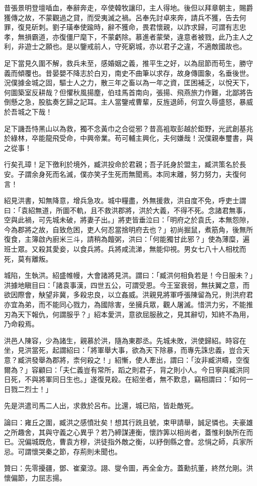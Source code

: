 \begin{pinyinscope}
昔張景明登壇喢血，奉辭奔走，卒使韓牧讓印，主人得地。後但以拜章朝主，賜爵獲傳之故，不蒙觀過之貸，而受夷滅之禍。呂奉先討卓來奔，請兵不獲，告去何罪，復見斫刺。劉子璜奉使踰時，辭不獲命，畏君懷親，以詐求歸，可謂有志忠孝，無損霸道，亦復僵尸麾下，不蒙虧除。慕進者蒙榮，違意者被戮，此乃主人之利，非遊士之願也。是以鑒戒前人，守死窮城，亦以君子之違，不適敵國故也。

足下當見久圍不解，救兵未至，感婚姻之義，推平生之好，以為屈節而苟生，勝守義而傾覆也。昔晏嬰不降志於白刃，南史不曲筆以求存，故身傳圖象，名垂後世。況僕據金城之固，驅士人之力，散三年之畜以為一年之資，匡困補乏，以悅天下，何圖築室反耕哉？但懼秋風揚塵，伯珪馬首南向，張揚、飛燕旅力作難，北鄙將告倒懸之急，股肱奏乞歸之記耳。主人當鑒戒曹輩，反旌退師，何宜久辱盛怒，暴威於吾城之下哉！

足下譏吾恃黑山以為救，獨不念黃巾之合從邪？昔高袓取彭越於鉅野，光武創基兆於綠林，卒能龍飛受命，中興帝業。苟可輔主興化，夫何嫌哉！況僕親奉璽書，與之從事！

行矣孔璋！足下徼利於境外，臧洪投命於君親；吾子託身於盟主，臧洪策名於長安。子謂余身死而名滅，僕亦笑子生死而無聞焉。本同末離，努力努力，夫復何言！

紹見洪書，知無降意，增兵急攻。城中糧盡，外無援救，洪自度不免，呼吏士謂曰：「袁紹無道，所圖不軌，且不救洪郡將，洪於大義，不得不死。念諸君無事，空與此禍，可先城未破，將妻子出。」將吏皆垂泣曰：「明府之於袁氏，本無怨隙，今為郡將之故，自致危困，吏人何忍當捨明府去也？」初尚掘鼠，煮筋角，後無所復食，主簿啟內廚米三斗，請稍為饘粥，洪曰：「何能獨甘此邪？」使為薄糜，遍班士眾。又殺其愛妾，以食兵將。兵將咸流涕，無能仰視。男女七八十人相枕而死，莫有離叛。

城陷，生執洪。紹盛帷幔，大會諸將見洪。謂曰：「臧洪何相負若是！今日服未？」洪據地瞋目曰：「諸袁事漢，四世五公，可謂受恩。今王室衰弱，無扶翼之意，而欲因際會，觖望非冀，多殺忠良，以立姦威。洪親見將軍呼張陳留為兄，則洪府君亦宜為弟，而不能同心戮力，為國除害，坐擁兵眾，觀人屠滅。惜洪力劣，不能推刃為天下報仇，何謂服乎？」紹本愛洪，意欲屈服赦之，見其辭切，知終不為用，乃命殺焉。

洪邑人陳容，少為諸生，親慕於洪，隨為東郡丞。先城未敗，洪使歸紹。時容在坐，見洪當死，起謂紹曰：「將軍舉大事，欲為天下除暴，而專先誅忠義，豈合天意？臧洪發舉為郡將，柰何殺之！」紹慚，使人牽出，謂曰：「汝非臧洪疇，空復爾為？」容顧曰：「夫仁義豈有常所，蹈之則君子，背之則小人。今日寧與臧洪同日死，不與將軍同日生也。」遂復見殺。在紹坐者，無不歎息，竊相謂曰：「如何一日戮二烈士！」

先是洪遣司馬二人出，求救於呂布。比還，城已陷，皆赴敵死。

論曰：雍丘之圍，臧洪之感憤壯矣！想其行跣且號，束甲請舉，誠足憐也。夫豪雄之所趣舍，其與守義之心異乎？若乃締謀連衡，懷詐筭以相尚者，蓋惟利埶所在而已。況偏城既危，曹袁方穆，洪徒指外敵之衡，以紓倒縣之會。忿悁之師，兵家所忌。可謂懷哭秦之節，存荊則未聞也。

贊曰：先零擾疆，鄧、崔棄涼。詡、燮令圖，再全金方。蓋勳抗董，終然允剛。洪懷偏節，力屈志揚。


\end{pinyinscope}